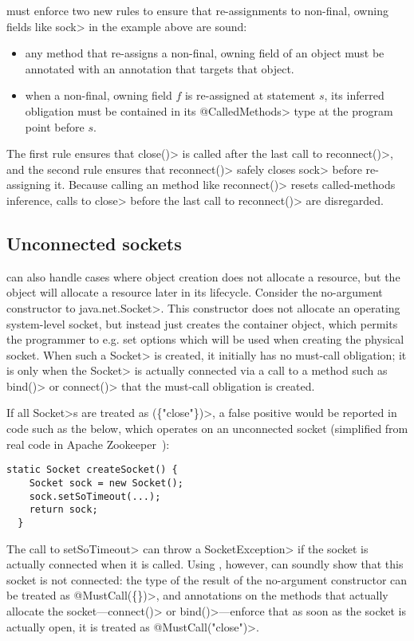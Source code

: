 \Tool must enforce two new rules to ensure that
re-assignments to non-final, owning fields like \<sock> in the example
above are sound:
\begin{itemize}
\item any method that re-assigns a non-final, owning field of an object
  must be annotated with an \CreateObligation annotation
  that targets that object.
\item when a non-final, owning field $f$ is re-assigned at statement $s$,
  its inferred \MustCall obligation must be contained in its \<@CalledMethods>
  type at the program point before $s$.
\end{itemize}
\noindent
The first rule ensures that \<close()> is called after the last call
to \<reconnect()>, and the second rule ensures that \<reconnect()>
safely closes \<sock> before re-assigning it. Because calling
an \CreateObligation method like \<reconnect()> resets called-methods
inference, calls to \<close> before the last call to \<reconnect()>
are disregarded.

\subsection{Unconnected sockets}
\label{sec:unconnected-sockets}
\CreateObligation can also handle cases where object creation
does not allocate a resource, but the object will allocate a resource
later in its lifecycle. Consider the no-argument constructor
to \<java.net.Socket>. This constructor does not allocate an
operating system-level socket, but instead just creates the container
object, which permits the programmer to e.g. set options which will be used
when creating the physical socket. When such a \<Socket> is created, it
initially has no must-call obligation; it is only when the \<Socket> is
actually connected via a call to a method such as \<bind()>
or \<connect()> that the must-call obligation is created.

If all \<Socket>s are treated as \MustCall\<(\{"close"\})>,
a false positive would be reported
in code such as the below, which operates on an unconnected socket
(simplified from real code in Apache Zookeeper~\cite{zookeeper-create-socket}):

\begin{lstlisting}[frame=tb,belowskip=3mm]
  static Socket createSocket() {
    Socket sock = new Socket();
    sock.setSoTimeout(...);
    return sock;
  }
\end{lstlisting}

\noindent
The call to \<setSoTimeout> can throw a \<SocketException> if the
socket is actually connected when it is called. Using \CreateObligation,
however, \Tool can soundly show that this socket is not connected:
the type of the result of the no-argument constructor can be
treated as \<@MustCall(\{\})>, and \CreateObligation annotations
on the methods that actually allocate the socket---\<connect()> or
\<bind()>---enforce that as soon as the socket is actually open,
it is treated as \<@MustCall("close")>.

